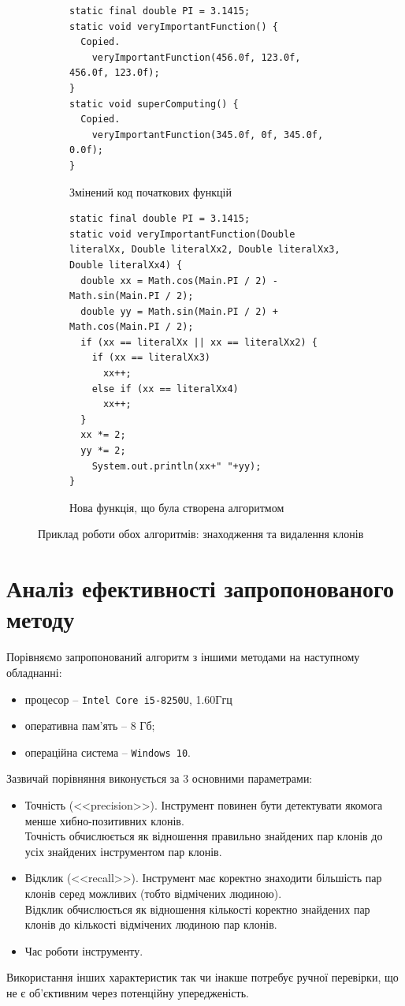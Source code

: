 \documentclass[a4paper, 14pt]{article}
\begin{document}
\begin{figure}[h!]
\centering
\begin{subfigure}[t]{0.4\textwidth}
\begin{lstlisting}[frame=none]
static final double PI = 3.1415;
static void veryImportantFunction() {
  Copied.
    veryImportantFunction(456.0f, 123.0f, 456.0f, 123.0f);
}
static void superComputing() {
  Copied.
    veryImportantFunction(345.0f, 0f, 345.0f, 0.0f);
}
\end{lstlisting}
\caption{Змінений код початкових функцій}
\end{subfigure}
\begin{subfigure}[t]{0.5\textwidth}
\begin{lstlisting}[frame=none]
static final double PI = 3.1415;
static void veryImportantFunction(Double literalXx, Double literalXx2, Double literalXx3, Double literalXx4) {
  double xx = Math.cos(Main.PI / 2) - Math.sin(Main.PI / 2);
  double yy = Math.sin(Main.PI / 2) + Math.cos(Main.PI / 2);
  if (xx == literalXx || xx == literalXx2) {
    if (xx == literalXx3)
      xx++;
    else if (xx == literalXx4)
      xx++;
  }
  xx *= 2;
  yy *= 2;
	System.out.println(xx+" "+yy);
}
\end{lstlisting}
\caption{Нова функція, що була створена алгоритмом}
\end{subfigure}
\caption{Приклад роботи обох алгоритмів: знаходження та видалення клонів}
\end{figure} 
\section{Аналіз ефективності запропонованого методу}
Порівняємо запропонований алгоритм з іншими методами на наступному обладнанні:
\begin{itemize}
\item процесор -- \verb|Intel Core i5-8250U|, 1.60Ггц
\item оперативна пам'ять -- 8 Гб;
\item операційна система -- \verb|Windows 10|.
\end{itemize} 
Зазвичай порівняння виконується за 3 основними параметрами: 
\begin{itemize}
\item Точність (<<precision>>). Інструмент повинен бути детектувати якомога менше хибно-позитивних клонів. \\ Точність обчислюється як відношення правильно знайдених пар клонів до усіх знайдених інструментом пар клонів.
\item Відклик (<<recall>>). Інструмент має коректно знаходити більшість пар клонів серед можливих (тобто відмічених людиною). \\ Відклик обчислюється як відношення кількості коректно знайдених пар клонів до кількості відмічених людиною пар клонів.
\item Час роботи інструменту.
\end{itemize}
Використання інших характеристик так чи інакше потребує ручної перевірки, що не є об'єктивним через потенційну упередженість.
\end{document}
